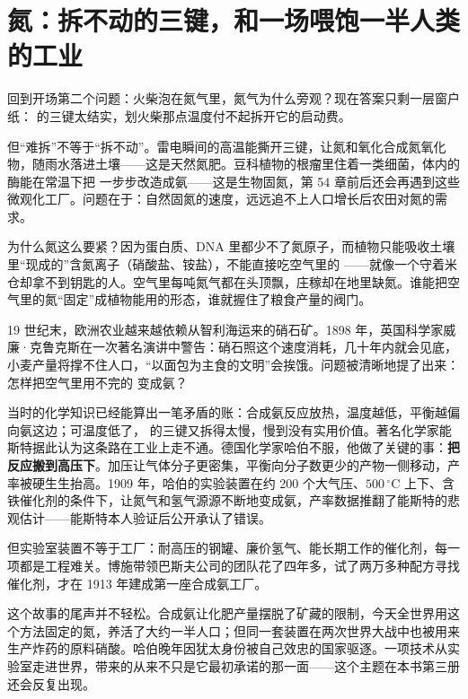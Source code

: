 \section{氮：拆不动的三键，和一场喂饱一半人类的工业}

回到开场第二个问题：火柴泡在氮气里，氮气为什么旁观？现在答案只剩一层窗户纸： 的三键太结实，划火柴那点温度付不起拆开它的启动费。

但“难拆”不等于“拆不动”。雷电瞬间的高温能撕开三键，让氮和氧化合成氮氧化物，随雨水落进土壤——这是天然氮肥。豆科植物的根瘤里住着一类细菌，体内的酶能在常温下把  一步步改造成氨——这是生物固氮，第 54 章前后还会再遇到这些微观化工厂。问题在于：自然固氮的速度，远远追不上人口增长后农田对氮的需求。

为什么氮这么要紧？因为蛋白质、DNA 里都少不了氮原子，而植物只能吸收土壤里“现成的”含氮离子（硝酸盐、铵盐），不能直接吃空气里的 ——就像一个守着米仓却拿不到钥匙的人。空气里每吨氮气都在头顶飘，庄稼却在地里缺氮。谁能把空气里的氮“固定”成植物能用的形态，谁就握住了粮食产量的阀门。

\begin{zhengju}
19 世纪末，欧洲农业越来越依赖从智利海运来的硝石矿。1898 年，英国科学家威廉·克鲁克斯在一次著名演讲中警告：硝石照这个速度消耗，几十年内就会见底，小麦产量将撑不住人口，“以面包为主食的文明”会挨饿。问题被清晰地提了出来：怎样把空气里用不完的  变成氨？

当时的化学知识已经能算出一笔矛盾的账：合成氨反应放热，温度越低，平衡越偏向氨这边；可温度低了， 的三键又拆得太慢，慢到没有实用价值。著名化学家能斯特据此认为这条路在工业上走不通。德国化学家哈伯不服，他做了关键的事：\textbf{把反应搬到高压下}。加压让气体分子更密集，平衡向分子数更少的产物一侧移动，产率被硬生生抬高。1909 年，哈伯的实验装置在约 200 个大气压、$500\,^{\circ}\mathrm{C}$ 上下、含铁催化剂的条件下，让氮气和氢气源源不断地变成氨，产率数据推翻了能斯特的悲观估计——能斯特本人验证后公开承认了错误。

但实验室装置不等于工厂：耐高压的钢罐、廉价氢气、能长期工作的催化剂，每一项都是工程难关。博施带领巴斯夫公司的团队花了四年多，试了两万多种配方寻找催化剂，才在 1913 年建成第一座合成氨工厂。

这个故事的尾声并不轻松。合成氨让化肥产量摆脱了矿藏的限制，今天全世界用这个方法固定的氮，养活了大约一半人口；但同一套装置在两次世界大战中也被用来生产炸药的原料硝酸。哈伯晚年因犹太身份被自己效忠的国家驱逐。一项技术从实验室走进世界，带来的从来不只是它最初承诺的那一面——这个主题在本书第三册还会反复出现。
\end{zhengju}

